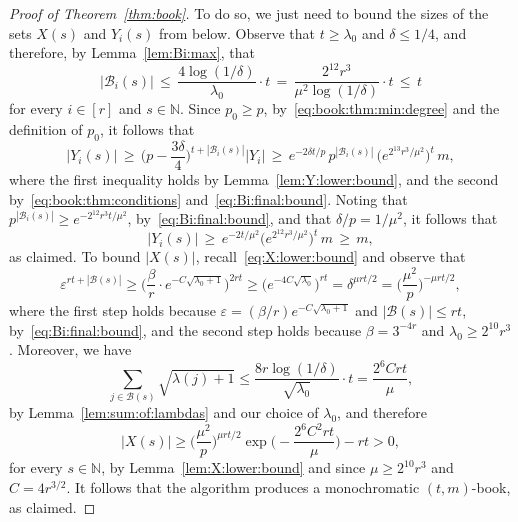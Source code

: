 \documentclass[12pt,reqno]{amsart}
\theoremstyle{definition}
\theoremstyle{remark}
\newcommand\N{\mathbb{N}}
\newcommand\cB{\mathcal{B}}
\newcommand\eps{\varepsilon}
\renewcommand{\le}{\leqslant}
\renewcommand{\ge}{\geqslant}
\def\eps{\varepsilon}
\def\N{\mathbb{N}}
\def\cB{\mathcal{B}}
\begin{document}
\begin{proof}[Proof of Theorem~\ref{thm:book}]
	To do so, we just need to bound the sizes of the sets \(X(s)\) and \(Y_i(s)\) from below. Observe that \(t \ge \lambda_0\) and \(\delta \le 1/4\), and therefore, by Lemma~\ref{lem:Bi:max}, that
	\begin{equation}
		\label{eq:Bi:final:bound}
		|\cB_i(s)| \, \le \, \frac{4 \log(1/\delta)}{\lambda_0} \cdot t \, = \, \frac{2^{12} r^3}{\mu^2 \log(1/\delta)} \cdot t \, \le \, t
	\end{equation}
	for every \(i \in [r]\) and \(s \in \N\). Since \(p_0 \ge p\), by~\eqref{eq:book:thm:min:degree} and the definition of \(p_0\), it follows that
	\begin{equation*}
		|Y_i(s)| \, \ge \, \bigg( p - \frac{3\delta}{4} \bigg)^{t + |\cB_i(s)|} |Y_i| \, \ge \, e^{-2\delta t / p} \, p^{|\cB_i(s)|} \, \big( e^{2^{13} r^3 / \mu^2} \big)^t \, m,
	\end{equation*}
	where the first inequality holds by Lemma~\ref{lem:Y:lower:bound}, and the second by~\eqref{eq:book:thm:conditions} and~\eqref{eq:Bi:final:bound}. Noting that \(p^{|\cB_i(s)|} \ge e^{-2^{12} r^3 t / \mu^2}\), by~\eqref{eq:Bi:final:bound}, and that \(\delta / p = 1/\mu^2\), it follows that
	\begin{equation*}
		|Y_i(s)| \, \ge \, e^{-2 t / \mu^2} \big( e^{2^{12} r^3 / \mu^2} \big)^t \, m \, \ge \, m,
	\end{equation*}
	as claimed. To bound \(|X(s)|\), recall~\eqref{eq:X:lower:bound} and observe that
	\begin{equation*}
		\eps^{rt + |\cB(s)|}  \ge \bigg( \frac{\beta}{r} \cdot e^{- C \sqrt{\lambda_0 + 1}} \bigg)^{2rt} \ge \big( e^{- 4C \sqrt{\lambda_0}} \big)^{rt} = \delta^{\mu r t/2} = \bigg( \frac{\mu^2}{p} \bigg)^{-\mu r t / 2},
	\end{equation*}
	where the first step holds because \(\eps = (\beta / r) e^{- C \sqrt{\lambda_0 + 1}}\) and \(|\cB(s)| \le rt\), by~\eqref{eq:Bi:final:bound}, and the second step holds because \(\beta = 3^{-4r}\) and \(\lambda_0 \ge 2^{10} r^3\). Moreover, we have
	\begin{equation*}
		\sum_{j \in \cB(s)} \sqrt{\lambda(j)+1} \le \frac{8r \log(1/\delta)}{\sqrt{\lambda_0}} \cdot t = \frac{2^6Crt}{\mu},
	\end{equation*}
	by Lemma~\ref{lem:sum:of:lambdas} and our choice of \(\lambda_0\), and therefore
	\begin{equation*}
		|X(s)| \ge \bigg( \frac{\mu^2}{p} \bigg)^{\mu r t / 2} \exp\bigg( - \frac{2^6C^2rt}{\mu} \bigg) - rt > 0,
	\end{equation*}
	for every \(s \in \N\), by Lemma~\ref{lem:X:lower:bound} and since \(\mu \ge 2^{10} r^3\) and \(C = 4r^{3/2}\). It follows that the algorithm produces a monochromatic \((t,m)\)-book, as claimed.
\end{proof}
%
\end{document}
